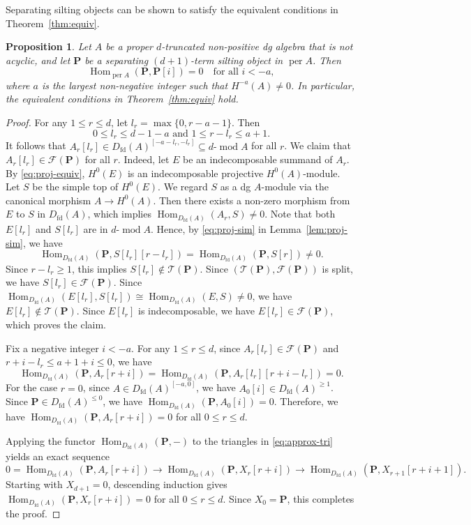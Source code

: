 \documentclass[11pt,a4paper,reqno]{amsart}
\theoremstyle{plain}
\newtheorem{proposition}[theorem]{Proposition}
\numberwithin{equation}{section}
\theoremstyle{definition}
\providecommand{\per}{\operatorname{per}}
\renewcommand{\mod}{\operatorname{mod}}
\newcommand{\Hom}{\operatorname{Hom}}
\newcommand{\emod}[2]{#1\text{-}\!\mod #2}
\newcommand{\PP}{\mathbf{P}}
\newcommand{\T}{\mathcal{T}}
\newcommand{\F}{\mathcal{F}}
\begin{document}
Separating silting objects can be shown to satisfy the equivalent conditions in Theorem~\ref{thm:equiv}.

\begin{proposition}\label{prop:separating}
  Let $A$ be a proper $d$-truncated non-positive dg algebra that is not acyclic, and let $\PP$ be a separating $(d+1)$-term silting object in $\per A$. Then
  \[\Hom_{\per A}(\PP,\PP[i])=0\quad\text{for all }i<-a,\]
  where $a$ is the largest non-negative integer such that $H^{-a}(A)\neq 0$. In particular, the equivalent conditions in Theorem~\ref{thm:equiv} hold.
\end{proposition}

\begin{proof}
  For any $1\leq r\leq d$, let $l_r=\max\{0,r-a-1\}$. Then
  \[0\leq l_r\leq d-1-a\text{ and }1\leq r-l_r\leq a+1.\]
  It follows that $A_r[l_r]\in D_{\mathrm{fd}}(A)^{[-a-l_r,-l_r]}\subseteq \emod{d}{A}$ for all $r$. We claim that $A_r[l_r]\in\F(\PP)$ for all $r$. Indeed, let $E$ be an indecomposable summand of $A_r$. By \eqref{eq:proj-equiv}, $H^0(E)$ is an indecomposable projective $H^0(A)$-module. Let $S$ be the simple top of $H^0(E)$. We regard $S$ as a dg $A$-module via the canonical morphism $A\to H^0(A)$. Then there exists a non-zero morphism from $E$ to $S$ in $D_{\mathrm{fd}}(A)$, which implies $\Hom_{D_{\mathrm{fd}}(A)}(A_r,S)\neq 0$. Note that both $E[l_r]$ and $S[l_r]$ are in $\emod{d}{A}$. Hence, by \eqref{eq:proj-sim} in Lemma~\ref{lem:proj-sim}, we have
  \[\Hom_{D_{\mathrm{fd}}(A)}(\PP,S[l_r][r-l_r])=\Hom_{D_{\mathrm{fd}}(A)}(\PP,S[r])\neq 0.\]
  Since $r-l_r\geq 1$, this implies $S[l_r]\notin\T(\PP)$. Since $(\T(\PP),\F(\PP))$ is split, we have $S[l_r]\in\F(\PP)$. Since $\Hom_{D_{\mathrm{fd}}(A)}(E[l_r],S[l_r])\cong\Hom_{D_{\mathrm{fd}}(A)}(E,S)\neq 0$, we have $E[l_r]\notin\T(\PP)$. Since $E[l_r]$ is indecomposable, we have $E[l_r]\in\F(\PP)$, which proves the claim.

  Fix a negative integer $i<-a$. For any $1\leq r\leq d$, since $A_r[l_r]\in\F(\PP)$ and $r+i-l_r\leq a+1+i\leq 0$, we have
  \[\Hom_{D_{\mathrm{fd}}(A)}(\PP,A_r[r+i])=\Hom_{D_{\mathrm{fd}}(A)}(\PP,A_r[l_r][r+i-l_r])=0.\]
  For the case $r=0$, since $A\in D_{\mathrm{fd}}(A)^{[-a,0]}$, we have $A_0[i]\in D_{\mathrm{fd}}(A)^{\geq 1}$. Since $\PP\in D_{\mathrm{fd}}(A)^{\leq 0}$, we have $\Hom_{D_{\mathrm{fd}}(A)}(\PP,A_0[i])=0$. Therefore, we have $\Hom_{D_{\mathrm{fd}}(A)}(\PP,A_r[r+i])=0$ for all $0\leq r\leq d$.

  Applying the functor $\Hom_{D_{\mathrm{fd}}(A)}(\PP,-)$ to the triangles in \eqref{eq:approx-tri} yields an exact sequence
  \[0=\Hom_{D_{\mathrm{fd}}(A)}(\PP,A_r[r+i])\to\Hom_{D_{\mathrm{fd}}(A)}(\PP,X_r[r+i])\to\Hom_{D_{\mathrm{fd}}(A)}(\PP,X_{r+1}[r+i+1]).\]
  Starting with $X_{d+1}=0$, descending induction gives $\Hom_{D_{\mathrm{fd}}(A)}(\PP,X_r[r+i])=0$ for all $0\leq r\leq d$. Since $X_0=\PP$, this completes the proof.
\end{proof}
\end{document}
